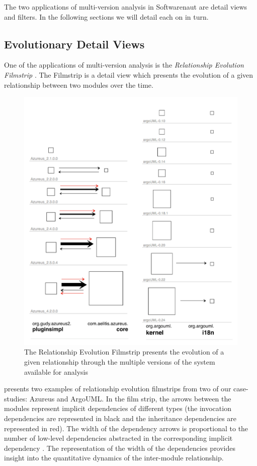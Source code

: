 \documentclass[preprint,12pt]{elsarticle}
\begin{document}
The two applications of multi-version analysis in Softwarenaut are detail views and filters. In the following sections we will detail each on in turn.

\newpage
\subsection {Evolutionary Detail Views}
One of the applications of multi-version analysis is the {\em Relationship Evolution Filmstrip} \cite{lungu-relevo}. The Filmstrip is a detail view which presents the evolution of a given relationship between two modules over the time. %

\begin{figure}[h]
\begin{center}
\includegraphics[width=0.82\linewidth]{images/Filmstrip}
\caption{The Relationship Evolution Filmstrip presents the evolution of a given relationship through the multiple versions of the system available for analysis}
\end{center}
\end{figure}


 presents two examples of relationship evolution filmstrips from two of our case-studies: Azureus and ArgoUML. In the film strip, the arrows between the modules represent implicit dependencies of different types (the invocation dependencies are represented in black and the inheritance dependencies are represented in red). The width of the dependency arrows is proportional to the number of low-level dependencies abstracted in the corresponding implicit dependency \cite{lungu-relevo}. The representation of the width of the dependencies provides insight into the quantitative dynamics of the inter-module relationship.
\end{document}
